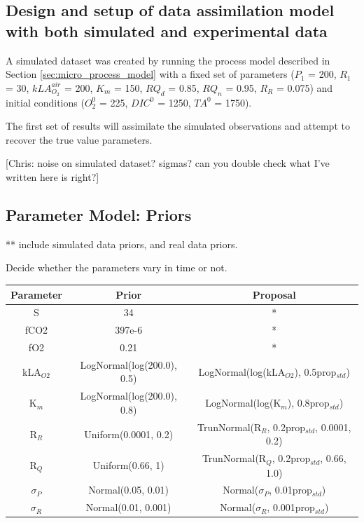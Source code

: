 \documentclass{ruthesis}
\begin{document}
\subsection{Design and setup of data assimilation model with both simulated and experimental data}

A simulated dataset was created by running the process model described in Section \ref{sec:micro_process_model} with a fixed set of parameters ($P_1$ = 200, $R_1$ = 30, $kLA_{O_2}^{air}$ = 200, $K_m$ = 150, $RQ_d$ = 0.85, $RQ_n$ = 0.95, $R_R$ = 0.075) and initial conditions ($O_2^0$ = 225, $DIC^0$ = 1250, $TA^0$ = 1750). 

The first set of results will assimilate the simulated observations and attempt to recover the true value parameters. 

[Chris: noise on simulated dataset? sigmas? can you double check what I've written here is right?]

\subsection{Parameter Model: Priors} \label{sec:micro_parameter_model}
** include simulated data priors, and real data priors.

Decide whether the parameters vary in time or not.




\begin{tabular}{c | c  |  c}
	Parameter & Prior &  Proposal \\ \hline
	S  & 34 & * \\
	fCO2  & 397e-6 &  *  \\
	fO2  & 0.21 &  *  \\
	kLA$_{O2}$  & LogNormal(log(200.0), 0.5)  & LogNormal(log(kLA$_{O2}$), 0.5prop$_{std}$) \\
	K$_m$ &  LogNormal(log(200.0), 0.8)  & LogNormal(log(K$_m$), 0.8prop$_{std}$) \\
	R$_R$  & Uniform(0.0001, 0.2) &  TrunNormal(R$_R$, 0.2prop$_{std}$, 0.0001, 0.2) \\
	R$_Q$  & Uniform(0.66, 1) &  TrunNormal(R$_Q$, 0.2prop$_{std}$, 0.66, 1.0)
	 \\
	$\sigma_P$ & Normal(0.05, 0.01) & Normal($\sigma_P$, 0.01prop$_{std}$) \\
	$\sigma_R$ & Normal(0.01, 0.001) & Normal($\sigma_R$, 0.001prop$_{std}$) \\
	
\end{tabular}
\newpage
\end{document}
